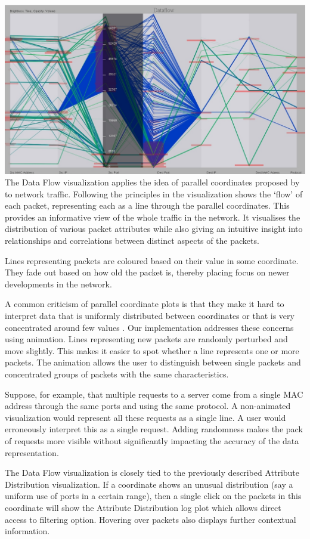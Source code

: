 \includegraphics[width=\linewidth]{materials/dataflow.jpg}
The Data Flow visualization applies the idea of parallel coordinates proposed by \cite{inselberg1985plane} to network traffic. Following the principles in \cite{fliggnetwork} the visualization shows the `flow' of each packet, representing each as a line through the parallel coordinates. This provides an informative view of the whole traffic in the network. It visualises the distribution of various packet attributes while also giving an intuitive insight into relationships and correlations between distinct aspects of the packets.

Lines representing packets are coloured based on their value in some coordinate. They fade out based on how old the packet is, thereby placing focus on newer developments in the network. 

A common criticism of parallel coordinate plots is that they make it hard to interpret data that is uniformly distributed between coordinates or that is very concentrated around few values \cite{marty2009applied}. Our implementation addresses these concerns using animation. Lines representing new packets are randomly perturbed and move slightly. This makes it easier to spot whether a line represents one or more packets. The animation allows the user to distinguish between single packets and concentrated groups of packets with the same characteristics.

Suppose, for example, that multiple requests to a server come from a single MAC address through the same ports and using the same protocol. A non-animated visualization would represent all these requests as a single line. A user would erroneously interpret this as a single request. Adding randomness makes the pack of requests more visible without significantly impacting the accuracy of the data representation.

The Data Flow visualization is closely tied to the previously described Attribute Distribution visualization. If a coordinate shows an unusual distribution (say a uniform use of ports in a certain range), then a single click on the packets in this coordinate will show the Attribute Distribution log plot which allows direct access to filtering option. Hovering over packets also displays further contextual information.

